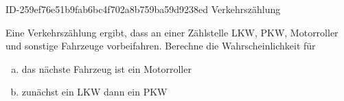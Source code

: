 \begin{exercise}
      {ID-259ef76e51b9fab6bc4f702a8b759ba59d9238ed}
      {Verkehrszählung}
  \ifproblem\problem\par
    Eine Verkehrszählung ergibt, dass an einer Zählstelle  LKW,  PKW,
     Motorroller und  sonstige Fahrzeuge vorbeifahren. Berechne die
    Wahrscheinlichkeit für
    \begin{enumerate}[a)]
      \item das nächste Fahrzeug ist ein Motorroller
      \item zunächst ein LKW dann ein PKW
    \end{enumerate}
  \fi
\end{exercise}
